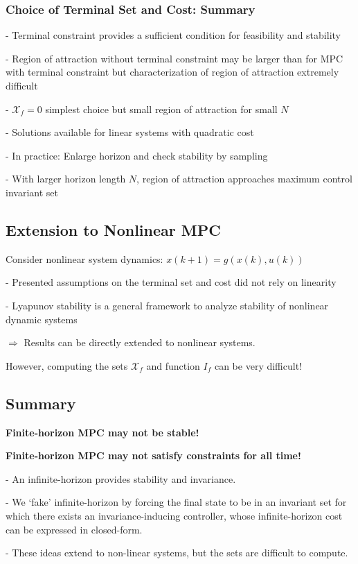 
\subsubsection{Choice of Terminal Set and Cost: Summary}

- Terminal constraint provides a sufficient condition
for feasibility and stability

- Region of attraction without terminal constraint may be larger than for
MPC with terminal constraint but characterization of region of attraction
extremely difficult %

- $\mathcal{X}_f = 0$ simplest choice
but small region of attraction for small $N$

- Solutions available for linear systems with quadratic cost

- In practice: Enlarge horizon and check stability by sampling

- With larger horizon length $N$,
region of attraction approaches maximum control invariant set

\subsection{Extension to Nonlinear MPC}

Consider nonlinear system dynamics: $x(k+1) = g(x(k), u(k))$


- Presented assumptions on the terminal set and cost
did not rely on linearity

- Lyapunov stability is a general framework to analyze
stability of nonlinear dynamic systems

$\Rightarrow$ Results can be directly extended to nonlinear systems.

However, computing the sets $\mathcal{X}_f$
and function $I_f$ can be very difficult!

\subsection{Summary}

\textbf{Finite-horizon MPC may not be stable!}

\textbf{Finite-horizon MPC may not satisfy constraints for all time!}

- An infinite-horizon provides stability and invariance.

- We ‘fake’ infinite-horizon by forcing the final state to be in an invariant
set for which there exists an invariance-inducing controller, whose
infinite-horizon cost can be expressed in closed-form.

- These ideas extend to non-linear systems,
but the sets are difficult to compute.
